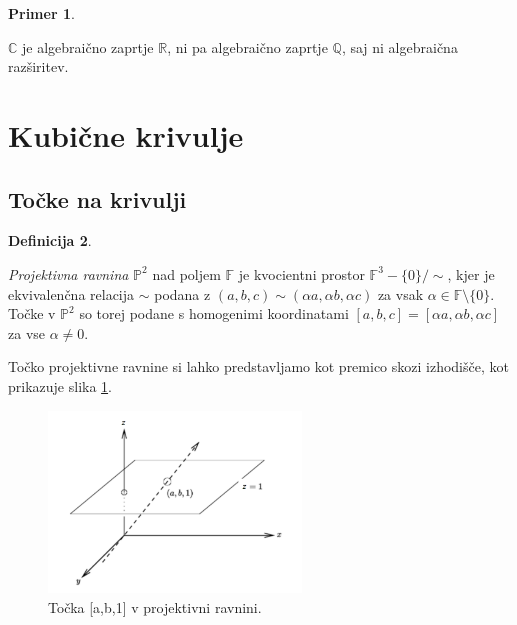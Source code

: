 \documentclass[12pt,a4paper,twoside]{article}
\theoremstyle{definition} %
\newtheorem{definicija}{Definicija}[section]
\newtheorem{primer}[definicija]{Primer}
\theoremstyle{plain} %
\numberwithin{equation}{section}  %
\newcommand{\R}{\mathbb R}
\renewcommand{\C}{\mathbb C}
\newcommand{\Q}{\mathbb Q}
\newcommand{\F}{\mathbb F}
\begin{document}
\begin{primer}~

$\C$ je algebraično zaprtje $\R$, ni pa algebraično zaprtje $\Q$, saj ni algebraična razširitev.

\end{primer}

\newpage

\section{Kubične krivulje}

\subsection{Točke na krivulji}

\begin{definicija}~

\emph{Projektivna ravnina} $\mathbb{P}^2$ nad poljem $\F$ je kvocientni prostor $\F^3-\{0\}/\! \!\sim$, kjer je ekvivalenčna relacija $\sim$ podana z $(a,b,c)\sim(\alpha a,\alpha b,\alpha c)$ za vsak $\alpha \in \F \setminus \{0\}$. Točke v $\mathbb{P}^2$ so torej podane s homogenimi koordinatami $[a,b,c] = [\alpha a,\alpha b,\alpha c]$ za vse $\alpha \neq 0$.
\end{definicija} 

Točko projektivne ravnine si lahko predstavljamo kot premico skozi izhodišče, kot prikazuje slika \ref{fig:ravnina}.


\begin{figure}[h]
  \centering
  \includegraphics[width=0.6\textwidth]{images/ravnina.png}
  \caption[Primer točke v projektivni ravnini.]{Točka [a,b,1] v projektivni ravnini.}
  \label{fig:ravnina}
\end{figure}
\end{document}
